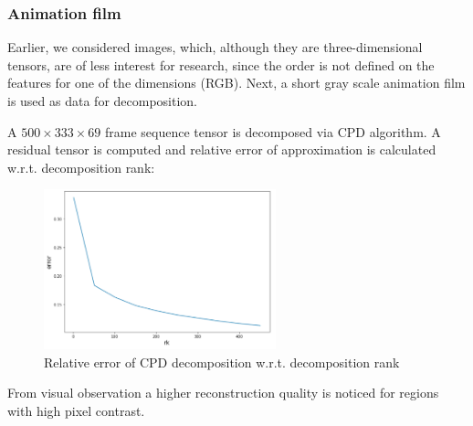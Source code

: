 \documentclass[../../main.tex]{subfiles}
\begin{document}
\subsubsection{Animation film}

Earlier, we considered images, which, although they are three-dimensional tensors, are of less interest for research, since the order is not defined on the features for one of the dimensions (RGB). Next, a short gray scale animation film is used as data for decomposition.

A $500 \times 333 \times 69$ frame sequence tensor is decomposed via CPD algorithm. A residual tensor is computed and relative error of approximation is calculated w.r.t. decomposition rank:

\begin{figure}[h!]
\centering
\includegraphics[width=0.6\textwidth]{figures/mickey_err}
\caption{Relative error of CPD decomposition w.r.t. decomposition rank}
\label{fig:Lab1:8}
\end{figure}

From visual observation a higher reconstruction quality is noticed for regions with high pixel contrast. 
\end{document}
